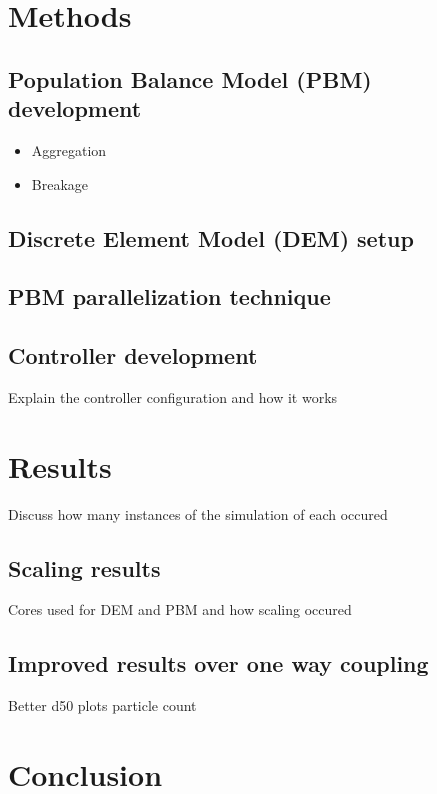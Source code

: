 \documentclass[fleqn,twoside,10pt]{article}
\begin{document}
\section{Methods}
\label{methods}

\subsection{Population Balance Model (PBM) development}
\label{sec_mthds_PBM}

\begin{itemize}
\item Aggregation
\item Breakage
\end{itemize}
\subsection{Discrete Element Model (DEM) setup}
\subsection{PBM parallelization technique}
\subsection{Controller development}
Explain the controller configuration and how it works
\section{Results}
\label{results}
Discuss how many instances of the simulation of each occured
\subsection{Scaling results}
Cores used for DEM and PBM and how scaling occured
\subsection{Improved results over one way coupling}
Better d50 plots particle count
\section{Conclusion}



\end{document}
